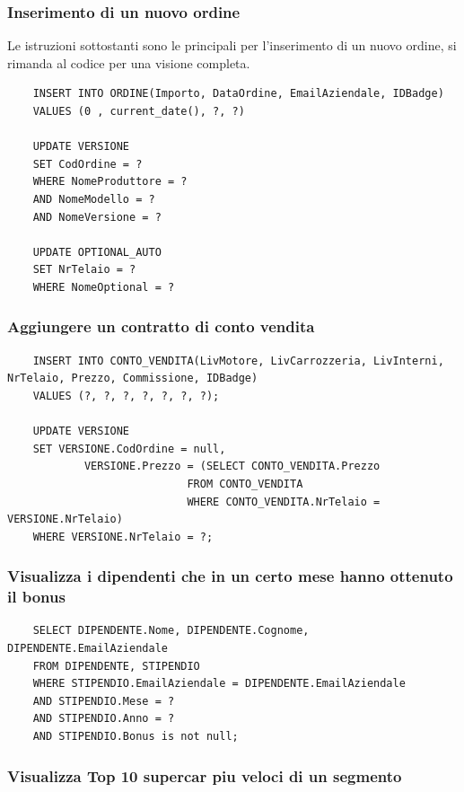\documentclass[11pt]{article}
\begin{document}
\subsubsection*{Inserimento di un nuovo ordine}

Le istruzioni sottostanti sono le principali per l'inserimento di un nuovo
ordine, si rimanda al codice per una visione completa.

\begin{lstlisting}
    INSERT INTO ORDINE(Importo, DataOrdine, EmailAziendale, IDBadge)
    VALUES (0 , current_date(), ?, ?)

    UPDATE VERSIONE
    SET CodOrdine = ?
    WHERE NomeProduttore = ?
    AND NomeModello = ?
    AND NomeVersione = ?

    UPDATE OPTIONAL_AUTO
    SET NrTelaio = ?
    WHERE NomeOptional = ?
\end{lstlisting}

\subsubsection*{Aggiungere un contratto di conto vendita}
\begin{lstlisting}
    INSERT INTO CONTO_VENDITA(LivMotore, LivCarrozzeria, LivInterni, NrTelaio, Prezzo, Commissione, IDBadge)
    VALUES (?, ?, ?, ?, ?, ?, ?);

    UPDATE VERSIONE
    SET VERSIONE.CodOrdine = null, 
            VERSIONE.Prezzo = (SELECT CONTO_VENDITA.Prezzo 
                            FROM CONTO_VENDITA 
                            WHERE CONTO_VENDITA.NrTelaio = VERSIONE.NrTelaio) 
    WHERE VERSIONE.NrTelaio = ?;
\end{lstlisting}

\subsubsection*{Visualizza i dipendenti che in un certo mese hanno ottenuto il
bonus}

\begin{lstlisting}
    SELECT DIPENDENTE.Nome, DIPENDENTE.Cognome, DIPENDENTE.EmailAziendale
    FROM DIPENDENTE, STIPENDIO
    WHERE STIPENDIO.EmailAziendale = DIPENDENTE.EmailAziendale
    AND STIPENDIO.Mese = ?
    AND STIPENDIO.Anno = ?
    AND STIPENDIO.Bonus is not null;
\end{lstlisting}

\subsubsection*{Visualizza Top 10 supercar piu veloci di un segmento}
\end{document}
